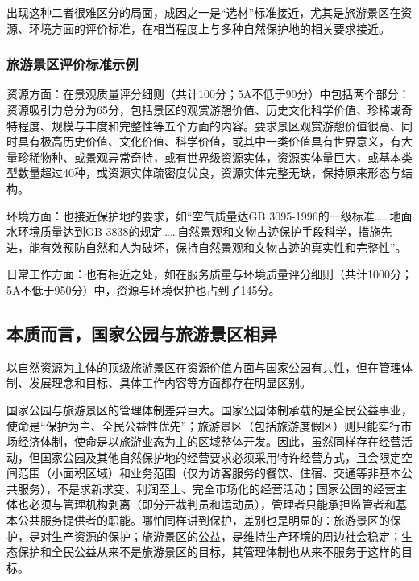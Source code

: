 \documentclass[
]{book}
\begin{document}
出现这种二者很难区分的局面，成因之一是``选材''标准接近，尤其是旅游景区在资源、环境方面的评价标准，在相当程度上与多种自然保护地的相关要求接近。

\hypertarget{ux65c5ux6e38ux666fux533aux8bc4ux4ef7ux6807ux51c6ux793aux4f8b}{%
\subsubsection{旅游景区评价标准示例}\label{ux65c5ux6e38ux666fux533aux8bc4ux4ef7ux6807ux51c6ux793aux4f8b}}

资源方面：在景观质量评分细则（共计100分；5A不低于90分）中包括两个部分：资源吸引力总分为65分，包括景区的观赏游憩价值、历史文化科学价值、珍稀或奇特程度、规模与丰度和完整性等五个方面的内容。要求景区观赏游憩价值很高、同时具有极高历史价值、文化价值、科学价值，或其中一类价值具有世界意义，有大量珍稀物种、或景观异常奇特，或有世界级资源实体，资源实体量巨大，或基本类型数量超过40种，或资源实体疏密度优良，资源实体完整无缺，保持原来形态与结构。

环境方面：也接近保护地的要求，如``空气质量达GB 3095-1996的一级标准\ldots\ldots 地面水环境质量达到GB 3838的规定\ldots\ldots 自然景观和文物古迹保护手段科学，措施先进，能有效预防自然和人为破坏，保持自然景观和文物古迹的真实性和完整性''。

日常工作方面：也有相近之处，如在服务质量与环境质量评分细则（共计1000分；5A不低于950分）中，资源与环境保护也占到了145分。

\hypertarget{ux672cux8d28ux800cux8a00ux56fdux5bb6ux516cux56edux4e0eux65c5ux6e38ux666fux533aux76f8ux5f02}{%
\subsection{本质而言，国家公园与旅游景区相异}\label{ux672cux8d28ux800cux8a00ux56fdux5bb6ux516cux56edux4e0eux65c5ux6e38ux666fux533aux76f8ux5f02}}

以自然资源为主体的顶级旅游景区在资源价值方面与国家公园有共性，但在管理体制、发展理念和目标、具体工作内容等方面都存在明显区别。

国家公园与旅游景区的管理体制差异巨大。国家公园体制承载的是全民公益事业，使命是``保护为主、全民公益性优先''；旅游景区（包括旅游度假区）则只能实行市场经济体制，使命是以旅游业态为主的区域整体开发。因此，虽然同样存在经营活动，但国家公园及其他自然保护地的经营要求必须采用特许经营方式，且会限定空间范围（小面积区域）和业务范围（仅为访客服务的餐饮、住宿、交通等非基本公共服务），不是求新求变、利润至上、完全市场化的经营活动；国家公园的经营主体也必须与管理机构剥离（即分开裁判员和运动员），管理者只能承担监管者和基本公共服务提供者的职能。哪怕同样讲到保护，差别也是明显的：旅游景区的保护，是对生产资源的保护；旅游景区的公益，是维持生产环境的周边社会稳定；生态保护和全民公益从来不是旅游景区的目标，其管理体制也从来不服务于这样的目标。
\end{document}

